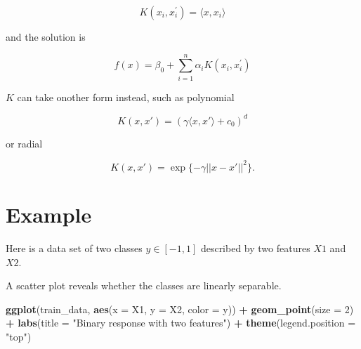 \documentclass[
]{book}
\newenvironment{Shaded}{\begin{snugshade}}{\end{snugshade}}
\newcommand{\DataTypeTok}[1]{\textcolor[rgb]{0.13,0.29,0.53}{#1}}
\newcommand{\DecValTok}[1]{\textcolor[rgb]{0.00,0.00,0.81}{#1}}
\newcommand{\KeywordTok}[1]{\textcolor[rgb]{0.13,0.29,0.53}{\textbf{#1}}}
\newcommand{\NormalTok}[1]{#1}
\newcommand{\OperatorTok}[1]{\textcolor[rgb]{0.81,0.36,0.00}{\textbf{#1}}}
\newcommand{\StringTok}[1]{\textcolor[rgb]{0.31,0.60,0.02}{#1}}
\begin{document}
\[K(x_i, x_i^{'}) = \langle x, x_i \rangle\]

and the solution is

\[f(x) = \beta_0 + \sum_{i = 1}^n {\alpha_i K(x_i, x_i^{'})}\]

\(K\) can take onother form instead, such as polynomial

\[K(x, x') = (\gamma \langle x, x' \rangle + c_0)^d\]

or radial

\[K(x, x') = \exp\{-\gamma ||x - x'||^2\}.\]

\hypertarget{example-8}{%
\section{Example}\label{example-8}}

Here is a data set of two classes \(y \in [-1, 1]\) described by two features \(X1\) and \(X2\).

\begin{Shaded}
\end{Shaded}

A scatter plot reveals whether the classes are linearly separable.

\begin{Shaded}
\begin{Highlighting}[]
\KeywordTok{ggplot}\NormalTok{(train_data, }\KeywordTok{aes}\NormalTok{(}\DataTypeTok{x =}\NormalTok{ X1, }\DataTypeTok{y =}\NormalTok{ X2, }\DataTypeTok{color =}\NormalTok{ y)) }\OperatorTok{+}
\StringTok{  }\KeywordTok{geom_point}\NormalTok{(}\DataTypeTok{size =} \DecValTok{2}\NormalTok{) }\OperatorTok{+}
\StringTok{  }\KeywordTok{labs}\NormalTok{(}\DataTypeTok{title =} \StringTok{"Binary response with two features"}\NormalTok{) }\OperatorTok{+}
\StringTok{  }\KeywordTok{theme}\NormalTok{(}\DataTypeTok{legend.position =} \StringTok{"top"}\NormalTok{)}
\end{Highlighting}
\end{Shaded}
\end{document}
